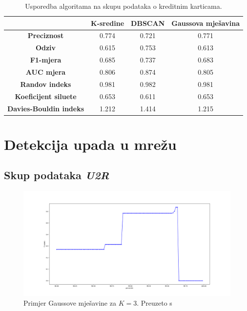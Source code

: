 \documentclass[utf8, diplomski, numeric]{fer}
\begin{document}
\begin{table}[h!]
  \begin{center}
    \caption{Usporedba algoritama na skupu podataka o kreditnim karticama.}
    \label{tab:creditcard}
    \begin{tabular}{c|c|c|c} 
      & \textbf{K-sredine} & \textbf{DBSCAN}  & \textbf{Gaussova mješavina}\\
      \hline
      \textbf{Preciznost} & 0.774 & 0.721 & 0.771 \\
      \textbf{Odziv} & 0.615 & 0.753 & 0.613 \\
      \textbf{F1-mjera} & 0.685 & 0.737 & 0.683 \\
      \textbf{AUC mjera} & 0.806 & 0.874 & 0.805 \\
      \textbf{Randov indeks} & 0.981 & 0.982 & 0.981 \\
       \textbf{Koeficijent siluete} & 0.653 & 0.611 & 0.653 \\
       \textbf{Davies-Bouldin indeks} & 1.212 & 1.414 & 1.215 \\
     \end{tabular}
  \end{center}
\end{table}

\section{Detekcija upada u mrežu}

\subsection{Skup podataka \textit{U2R}}

\begin{figure}[htb]
\includegraphics[width=1\textwidth]{images/u2r-kmeans-f1.png}
\centering
\caption{Primjer Gaussove mješavine za $K = 3$. Preuzeto s  \cite{GaussianMixtureExplained}}
\label{fig:u2r-kmeans}
\end{figure}
\end{document}
